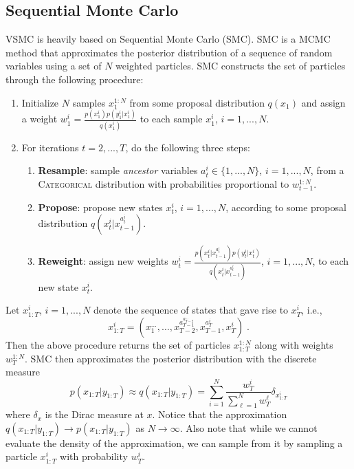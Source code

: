 \documentclass[12pt]{article}
\newcommand{\vsmc}{\textsc{VSMC}\xspace}
\newcommand{\smc}{\textsc{SMC}\xspace}
\newcommand{\mcmc}{\textsc{MCMC}\xspace}
\newcommand{\categorical}{\textsc{Categorical}\xspace}
\begin{document}
\subsection{Sequential Monte Carlo}

\vsmc is heavily based on Sequential Monte Carlo (\smc). \smc is a \mcmc method that approximates the posterior distribution of a sequence of random variables using a set of $N$ weighted particles. \smc constructs the set of particles through the following procedure:
\begin{enumerate}

\item
Initialize $N$ samples $x_1^{1:N}$ from some proposal distribution $q(x_1)$ and assign a weight $w_1^i=\frac{p(x_1^i)p(y_1^i|x_1^i)}{q(x_1^i)}$ to each sample $x_1^i$, $i=1,...,N$.

\item
For iterations $t=2,...,T$, do the following three steps:
\begin{enumerate}

\item
\textbf{Resample}: sample \textit{ancestor} variables $a_t^i\in\{1,...,N\}$, $i=1,...,N$, from a \categorical distribution with probabilities proportional to $w_{t-1}^{1:N}$.

\item
\textbf{Propose}: propose new states $x_t^i$, $i=1,...,N$, according to some proposal distribution $q(x_t^i|x_{t-1}^{a_t^i})$.

\item
\textbf{Reweight}: assign new weights $w_t^i=\frac{p(x_t^i|x_{t-1}^{a_t^i})p(y_t^i|x_t^i)}{q(x_t^i|x_{t-1}^{a_t^i})}$, $i=1,...,N$, to each new state $x_t^i$.

\end{enumerate}

\end{enumerate}

Let $x_{1:T}^i$, $i=1,...,N$ denote the sequence of states that gave rise to $x_T^i$, i.e.,
\[
x_{1:T}^i=\left(x_1^{\ldots},\ldots, x_{T-2}^{a_{T-1}^{a_{T-2}^{\ldots}}}, x_{T-1}^{a_T^i}, x_T^i\right) \;.
\]
Then the above procedure returns the set of particles $x_{1:T}^{1:N}$ along with weights $w_T^{1:N}$. \smc then approximates the posterior distribution with the discrete measure
\[
p(x_{1:T}|y_{1:T}) \approx q(x_{1:T}|y_{1:T}) = \sum_{i=1}^N\frac{w_T^i}{\sum_{\ell=1}^Nw_T^\ell}\delta_{x_{1:T}^i}
\]
where $\delta_x$ is the Dirac measure at $x$. Notice that the approximation $q(x_{1:T}|y_{1:T})\rightarrow p(x_{1:T}|y_{1:T})$ as $N\rightarrow\infty$. Also note that while we cannot evaluate the density of the approximation, we can sample from it by sampling a particle $x_{1:T}^i$ with probability $w_T^i$.
\end{document}

